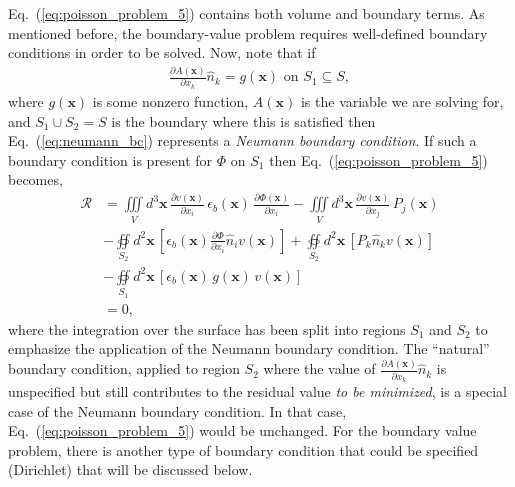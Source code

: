 \documentclass[22pt]{article} %
\begin{document}
%
Eq.~(\ref{eq:poisson_problem_5}) contains both volume and boundary terms.
%
As mentioned before, the boundary-value problem requires well-defined boundary conditions in order to be solved.
%
Now, note that if
%
\begin{align}\label{eq:neumann_bc}
\frac{\partial A(\textbf{x})}{\partial x_k} \hat{n}_k = g (\textbf{x})\,\,\mathrm{on}\,\, S_1 \subseteq S,
\end{align}
%
where $g(\textbf{x})$ is some nonzero function, $A(\textbf{x})$ is the variable we are solving for, and $S_1 \cup S_2 = S$ is the boundary where this is satisfied then Eq.~(\ref{eq:neumann_bc}) represents a \emph{Neumann boundary condition}.  
%
If such a boundary condition is present for $\Phi$ on $S_1$ then  Eq.~(\ref{eq:poisson_problem_5}) becomes,
%
\begin{align}\label{eq:poisson_problem_5_BC}
\mathscr{R} &= \iiint\limits_V d^3 \textbf{x} \, \frac{\partial v(\textbf{x})}{\partial x_i} \, \epsilon_b(\textbf{x}) \, \frac{\partial \Phi(\textbf{x})}{\partial x_i} - \iiint\limits_V d^3 \textbf{x} \, \frac{\partial v(\textbf{x})}{\partial x_j}\, P_j(\textbf{x}) \\ \nonumber
&- \oiint\limits_{S_2} d^2 \textbf{x} \, \left[\epsilon_b(\textbf{x}) \frac{\partial \Phi}{\partial x_i} \hat{n}_i v(\textbf{x})\right] + \oiint\limits_{S_2} d^2 \textbf{x} \, \left[ P_k \hat{n}_k v(\textbf{x})\right] \\ \nonumber
&- \oiint\limits_{S_1} d^2 \textbf{x} \, \left[\epsilon_b(\textbf{x}) \,g(\textbf{x})\, v(\textbf{x})\right] \\ \nonumber
&= 0,
\end{align}
%
where the integration over the surface has been split into regions $S_1$ and $S_2$ to emphasize the application of the Neumann boundary condition.
%
The ``natural'' boundary condition, applied to region $S_2$ where the value of $\frac{\partial A(\textbf{x})}{\partial x_k} \hat{n}_k $ is unspecified but still contributes to the residual value \emph{to be minimized}, is a special case of the Neumann boundary condition.
%
In that case, Eq.~(\ref{eq:poisson_problem_5}) would be unchanged.
%
For the boundary value problem, there is another type of boundary condition that could be specified (Dirichlet)
that will be discussed below.
%
\end{document}
